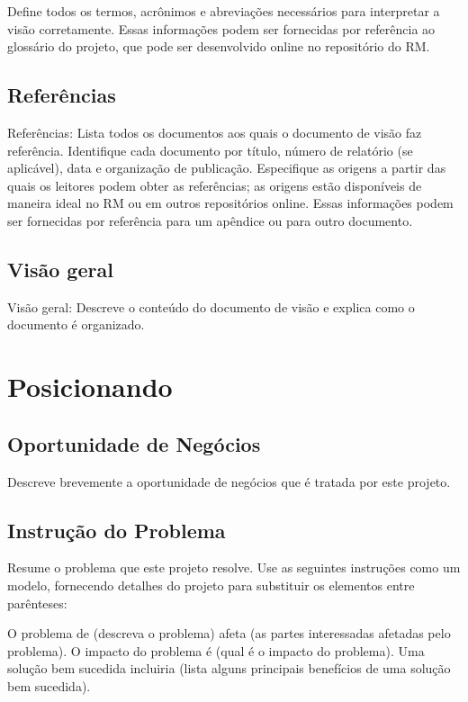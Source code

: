 \documentclass{report}
\begin{document}
Define todos os termos, acrônimos e abreviações necessários para interpretar a
visão corretamente. Essas informações podem ser fornecidas por referência ao
glossário do projeto, que pode ser desenvolvido online no repositório do RM.

\section{Referências}

Referências: Lista todos os documentos aos quais o documento de visão faz
referência. Identifique cada documento por título, número de relatório (se
aplicável), data e organização de publicação. Especifique as origens a partir
das quais os leitores podem obter as referências; as origens estão disponíveis
de maneira ideal no RM ou em outros repositórios online. Essas informações
podem ser fornecidas por referência para um apêndice ou para outro documento.

\section{Visão geral}

Visão geral: Descreve o conteúdo do documento de visão e explica como o
documento é organizado.

\chapter{Posicionando}

\section{Oportunidade de Negócios}

Descreve brevemente a oportunidade de negócios que é tratada por este projeto.

\section{Instrução do Problema}

Resume o problema que este projeto resolve. Use as seguintes instruções como um
modelo, fornecendo detalhes do projeto para substituir os elementos entre
parênteses:

O problema de (descreva o problema) afeta (as partes interessadas afetadas pelo
problema). O impacto do problema é (qual é o impacto do problema). Uma solução
bem sucedida incluiria (lista alguns principais benefícios de uma solução bem
sucedida).
\end{document}
